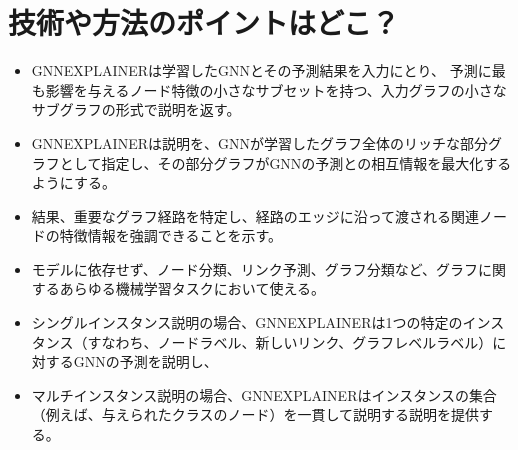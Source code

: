 \documentclass[a4paper,10pt]{ltjsarticle}
\newcommand{\1}{\mbox{1}\hspace{-0.25em}\mbox{l}}
\theoremstyle{definition}
\begin{document}
    \section{技術や方法のポイントはどこ？}
    \begin{itemize}
        \item GNNEXPLAINERは学習したGNNとその予測結果を入力にとり、
        予測に最も影響を与えるノード特徴の小さなサブセットを持つ、入力グラフの小さなサブグラフの形式で説明を返す。
        \item GNNEXPLAINERは説明を、GNNが学習したグラフ全体のリッチな部分グラフとして指定し、その部分グラフがGNNの予測との相互情報を最大化するようにする。
        \item 結果、重要なグラフ経路を特定し、経路のエッジに沿って渡される関連ノードの特徴情報を強調できることを示す。
    \end{itemize}
    \begin{itemize}
        \item モデルに依存せず、ノード分類、リンク予測、グラフ分類など、グラフに関するあらゆる機械学習タスクにおいて使える。
        \item シングルインスタンス説明の場合、GNNEXPLAINERは1つの特定のインスタンス（すなわち、ノードラベル、新しいリンク、グラフレベルラベル）に
        対するGNNの予測を説明し、
        \item マルチインスタンス説明の場合、GNNEXPLAINERはインスタンスの集合（例えば、与えられたクラスのノード）を一貫して説明する説明を提供する。
    \end{itemize}
\end{document}
